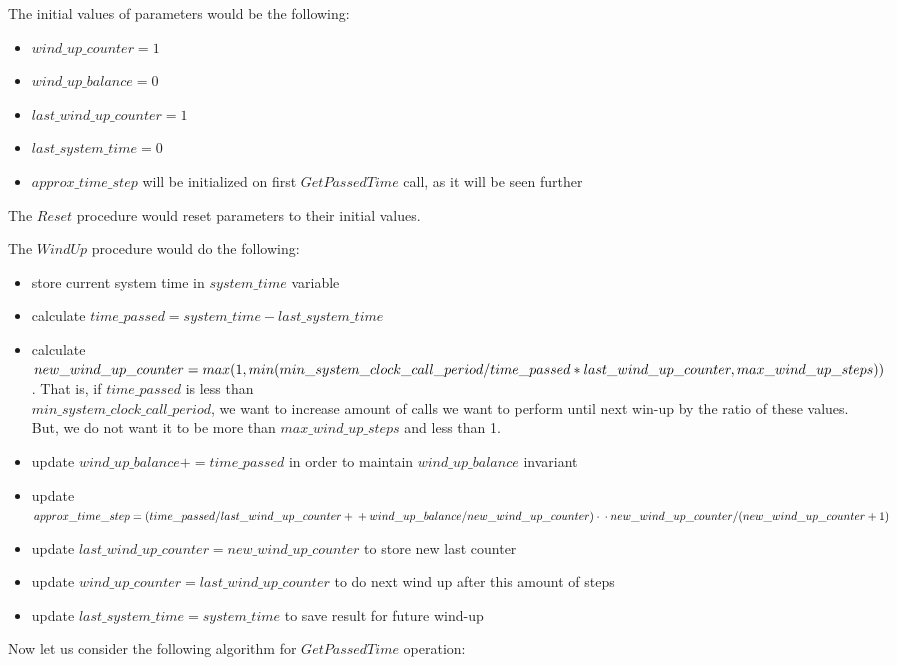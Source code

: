 \documentclass{article}
\begin{document}
The initial values of parameters would be the following:
\begin{itemize}
	\item $wind\_up\_counter = 1$
	\item $wind\_up\_balance = 0$
	\item $last\_wind\_up\_counter = 1$
	\item $last\_system\_time = 0$
	\item $approx\_time\_step$ will be initialized on first $GetPassedTime$ call, as it will be seen further
\end{itemize}

The $Reset$ procedure would reset parameters to their initial values.

The $WindUp$ procedure would do the following:
\begin{itemize}
	\item store current system time in $system\_time$ variable
	\item calculate $time\_passed = system\_time - last\_system\_time$
	\item calculate $new\_wind\_up\_counter = max(1, \\min(min\_system\_clock\_call\_period / time\_passed * last\_wind\_up\_counter,\\ max\_wind\_up\_steps))$. That is, if $time\_passed$ is less than \\$min\_system\_clock\_call\_period$, we want to increase amount of calls we want to perform until next win-up by the ratio of these values. But, we do not want it to be more than $max\_wind\_up\_steps$ and less than 1.
	\item update $wind\_up\_balance += time\_passed$ in order to maintain $wind\_up\_balance$ invariant
	\item update $approx\_time\_step = (time\_passed / last\_wind\_up\_counter +\\+ wind\_up\_balance / new\_wind\_up\_counter) \cdot \\ \cdot new\_wind\_up\_counter / (new\_wind\_up\_counter + 1)$
	\item update $last\_wind\_up\_counter = new\_wind\_up\_counter$ to store new last counter
	\item update $wind\_up\_counter = last\_wind\_up\_counter$ to do next wind up after this amount of steps
	\item update $last\_system\_time = system\_time$ to save result for future wind-up
\end{itemize}
Now let us consider the following algorithm for $GetPassedTime$ operation:
\end{document}
